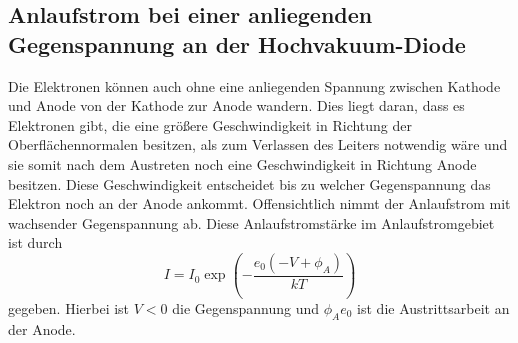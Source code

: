 \subsection{Anlaufstrom bei einer anliegenden Gegenspannung an der Hochvakuum-Diode}
Die Elektronen können auch ohne eine anliegenden Spannung zwischen Kathode und Anode von der Kathode zur Anode wandern. Dies liegt daran, dass es Elektronen gibt, die eine größere Geschwindigkeit in Richtung der Oberflächennormalen besitzen, als zum Verlassen des Leiters notwendig wäre und sie somit nach dem Austreten noch eine Geschwindigkeit in Richtung Anode besitzen. Diese Geschwindigkeit entscheidet bis zu welcher Gegenspannung das Elektron noch an der Anode ankommt. Offensichtlich nimmt der Anlaufstrom mit wachsender Gegenspannung ab. Diese Anlaufstromstärke im Anlaufstromgebiet ist durch 
\begin{equation} 
	I = I_0 \exp\left(-\frac{e_0 (-V +\phi_A)}{k T}\right) \label{eq:Anlaufstromstärke}
\end{equation}
gegeben. Hierbei ist $V<0$ die Gegenspannung und $\phi_A e_0$ ist die Austrittsarbeit an der Anode.



